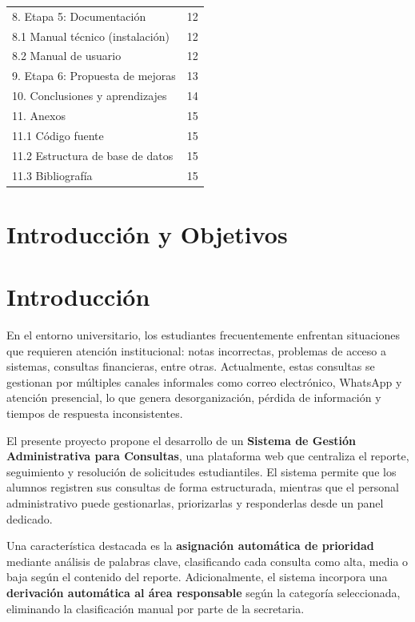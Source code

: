 \documentclass[12pt,a4paper]{article}
\begin{document}
\begin{tabular}{p{12cm} r}
	8. Etapa 5: Documentación & 12 \\[0.2cm]
	\hspace*{1cm}8.1 Manual técnico (instalación) & 12 \\[0.2cm]
	\hspace*{1cm}8.2 Manual de usuario & 12 \\[0.2cm]
	9. Etapa 6: Propuesta de mejoras & 13 \\[0.2cm]
	10. Conclusiones y aprendizajes & 14 \\[0.2cm]
	11. Anexos & 15 \\[0.2cm]
	\hspace*{1cm}11.1 Código fuente & 15 \\[0.2cm]
	\hspace*{1cm}11.2 Estructura de base de datos & 15 \\[0.2cm]
	\hspace*{1cm}11.3 Bibliografía & 15 \\
	\end{tabular}

	\newpage

	\section*{\centering Introducción y Objetivos}

	\section{Introducción}
	En el entorno universitario, los estudiantes frecuentemente enfrentan situaciones que requieren atención institucional: notas incorrectas, problemas de acceso a sistemas, consultas financieras, entre otras. Actualmente, estas consultas se gestionan por múltiples canales informales como correo electrónico, WhatsApp y atención presencial, lo que genera desorganización, pérdida de información y tiempos de respuesta inconsistentes.

	El presente proyecto propone el desarrollo de un \textbf{Sistema de Gestión Administrativa para Consultas}, una plataforma web que centraliza el reporte, seguimiento y resolución de solicitudes estudiantiles. El sistema permite que los alumnos registren sus consultas de forma estructurada, mientras que el personal administrativo puede gestionarlas, priorizarlas y responderlas desde un panel dedicado.

	Una característica destacada es la \textbf{asignación automática de prioridad} mediante análisis de palabras clave, clasificando cada consulta como alta, media o baja según el contenido del reporte. Adicionalmente, el sistema incorpora una \textbf{derivación automática al área responsable} según la categoría seleccionada, eliminando la clasificación manual por parte de la secretaria.
\end{document}
